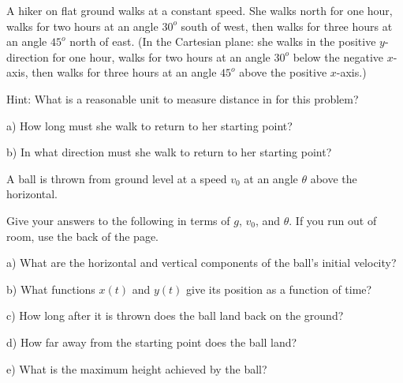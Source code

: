 \documentclass[12pt]{article}
\begin{document}
A hiker on flat ground walks at a constant speed. She walks north for one hour, walks for two hours at an angle $30^o$ south of west, then walks for three hours at an angle
$45^o$ north of east. (In the Cartesian plane: she walks in the positive $y$-direction for one hour, walks for two hours at an angle $30^o$ below the negative $x$-axis, then walks 
for three hours at an angle $45^o$ above the positive $x$-axis.)

Hint: What is a reasonable unit to measure distance in for this problem?

\bigskip
  
\it

a) How long must she walk to return to her starting point?

\vspace{3in}

b) In what direction must she walk to return to her starting point?


\newpage






        \Large \centerline{}
        \normalsize
        \rm

A ball is thrown from ground level at a speed $v_0$ at an angle $\theta$ above the horizontal.

\bigskip

Give your answers to the following in terms of $g$, $v_0$, and $\theta$. If you run out of room, use the back of the page.

\it \bigskip

a) What are the horizontal and vertical components of the ball's initial velocity?

\vspace{1in}

b) What functions $x(t)$ and $y(t)$ give its position as a function of time?

\vspace{1in}

c) How long after it is thrown does the ball land back on the ground? 

\vspace{1in}

d) How far away from the starting point does the ball land? 

\vspace{1in}

e) What is the maximum height achieved by the ball?

\newpage
\end{document}
